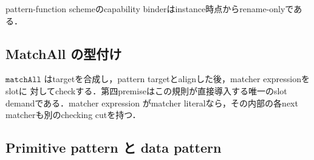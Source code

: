 pattern-function schemeのcapability binderはinstance時点からrename-onlyである．
\begin{mathpar}
\end{mathpar}

\subsection{MatchAll の型付け}

$\mathtt{matchAll}$ はtargetを合成し，pattern targetとalignした後，matcher expressionをslotに
対してcheckする．第四premiseはこの規則が直接導入する唯一のslot demandである．matcher expression
がmatcher literalなら，その内部の各next matcherも別のchecking cutを持つ．
\begin{mathpar}
\end{mathpar}

\subsection{Primitive pattern と data pattern}

